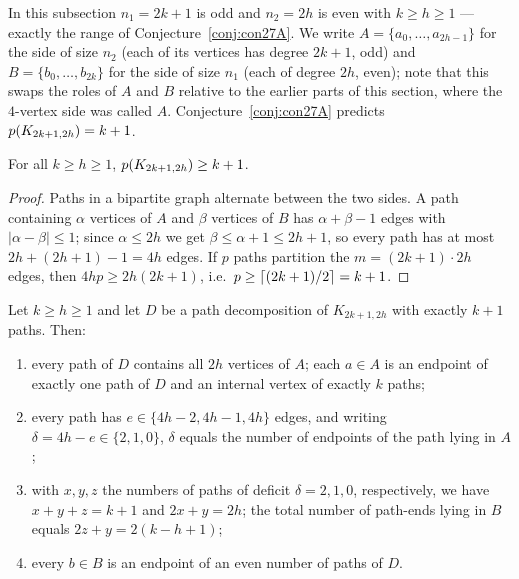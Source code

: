 In this subsection $n_1=2k+1$ is odd and $n_2=2h$ is even with
$k\ge h\ge1$ --- exactly the range of Conjecture~\ref{conj:con27A}. We
write $A=\{a_0,\dots,a_{2h-1}\}$ for the side of size $n_2$ (each of its
vertices has degree $2k+1$, odd) and $B=\{b_0,\dots,b_{2k}\}$ for the side
of size $n_1$ (each of degree $2h$, even); note that this swaps the roles
of $A$ and $B$ relative to the earlier parts of this section, where the
$4$-vertex side was called $A$. Conjecture~\ref{conj:con27A} predicts
$p(K_{2k+1,2h})=k+1$.

\begin{theorem}\label{thm:concapgen}
For all $k\ge h\ge1$, $p(K_{2k+1,2h})\ge k+1$.
\end{theorem}

\begin{proof}
Paths in a bipartite graph alternate between the two sides. A path
containing $\alpha$ vertices of $A$ and $\beta$ vertices of $B$ has
$\alpha+\beta-1$ edges with $|\alpha-\beta|\le1$; since $\alpha\le2h$ we
get $\beta\le\alpha+1\le2h+1$, so every path has at most
$2h+(2h+1)-1=4h$ edges. If $p$ paths partition the $m=(2k+1)\cdot2h$
edges, then $4hp\ge2h(2k+1)$, i.e.\ $p\ge\left\lceil (2k+1)/2 \right\rceil=k+1$.
\end{proof}

\begin{theorem}
\label{thm:constructgen}
Let $k\ge h\ge1$ and let $D$ be a path decomposition of $K_{2k+1,2h}$ with
exactly $k+1$ paths. Then:
\begin{enumerate}[label={\rm(\arabic*)},leftmargin=2em]
\item every path of $D$ contains all $2h$ vertices of $A$; each $a\in A$
is an endpoint of exactly one path of $D$ and an internal vertex of
exactly $k$ paths;
\item every path has $e\in\{4h-2,4h-1,4h\}$ edges, and writing
$\delta=4h-e\in\{2,1,0\}$, $\delta$ equals the number of endpoints of the
path lying in $A$;
\item with $x,y,z$ the numbers of paths of deficit $\delta=2,1,0$,
respectively, we have $x+y+z=k+1$ and $2x+y=2h$; the total number of
path-ends lying in $B$ equals $2z+y=2(k-h+1)$;
\item every $b\in B$ is an endpoint of an even number of paths of $D$.
\end{enumerate}
\end{theorem}

